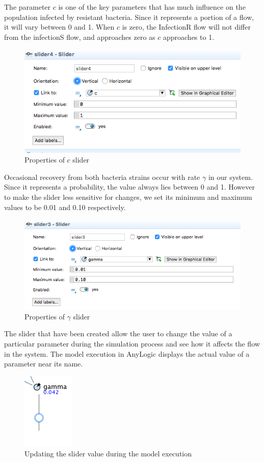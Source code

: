 The parameter $c$ is one of the key parameters that has much influence on the population infected by resistant bacteria. Since it represents a portion of a flow, it will vary between 0 and 1. When $c$ is zero, the InfectionR flow will not differ from the infectionS flow, and approaches zero as $c$ approaches to 1.

\begin{figure}[H]
  \centering
  \includegraphics[height=0.3\textwidth]{img/screens/sliders/sliders8}
  \caption{Properties of $c$ slider}
\end{figure}

Occasional recovery from both bacteria strains occur with rate $\gamma$ in our system. Since it represents a probability, the value always lies between 0 and 1. However to make the slider less sensitive for changes, we set its minimum and maximum values to be 0.01 and 0.10 respectively.

\begin{figure}[H]
  \centering
  \includegraphics[height=0.3\textwidth]{img/screens/sliders/sliders9}
  \caption{Properties of $\gamma$ slider}
\end{figure}

The slider that have been created allow the user to change the value of a particular parameter during the simulation process and see how it affects the flow in the system. The model execution in AnyLogic displays the actual value of a parameter near its name.

\begin{figure}[H]
  \centering
  \includegraphics[height=0.2\textwidth]{img/screens/sliders/sliders5}
  \caption{Updating the slider value during the model execution}
\end{figure}

